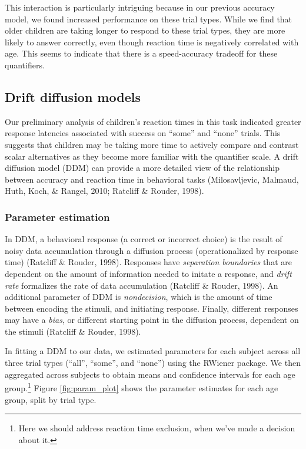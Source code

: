 \documentclass[10pt, letterpaper]{article}
\begin{document}
This interaction is particularly intriguing because in our previous
accuracy model, we found increased performance on these trial types.
While we find that older children are taking longer to respond to these
trial types, they are more likely to answer correctly, even though
reaction time is negatively correlated with age. This seems to indicate
that there is a speed-accuracy tradeoff for these quantifiers.

\subsection{Drift diffusion models}\label{drift-diffusion-models}

Our preliminary analysis of children's reaction times in this task
indicated greater response latencies associated with success on ``some''
and ``none'' trials. This suggests that children may be taking more time
to actively compare and contrast scalar alternatives as they become more
familiar with the quantifier scale. A drift diffusion model (DDM) can
provide a more detailed view of the relationship between accuracy and
reaction time in behavioral tasks (Milosavljevic, Malmaud, Huth, Koch,
\& Rangel, 2010; Ratcliff \& Rouder, 1998).

\subsubsection{Parameter estimation}\label{parameter-estimation}

In DDM, a behavioral response (a correct or incorrect choice) is the
result of noisy data accumulation through a diffusion process
(operationalized by response time) (Ratcliff \& Rouder, 1998). Responses
have \emph{separation boundaries} that are dependent on the amount of
information needed to initate a response, and \emph{drift rate}
formalizes the rate of data accumulation (Ratcliff \& Rouder, 1998). An
additional parameter of DDM is \emph{nondecision}, which is the amount
of time between encoding the stimuli, and initiating response. Finally,
different responses may have a \emph{bias}, or different starting point
in the diffusion process, dependent on the stimuli (Ratcliff \& Rouder,
1998).

In fitting a DDM to our data, we estimated parameters for each subject
across all three trial types (``all'', ``some'', and ``none'') using the
RWiener package. We then aggregated across subjects to obtain means and
confidence intervals for each age
group.\footnote{Here we should address reaction time exclusion, when we've made a decision about it.}
Figure \ref{fig:param_plot} shows the parameter estimates for each age
group, split by trial type.
\end{document}
